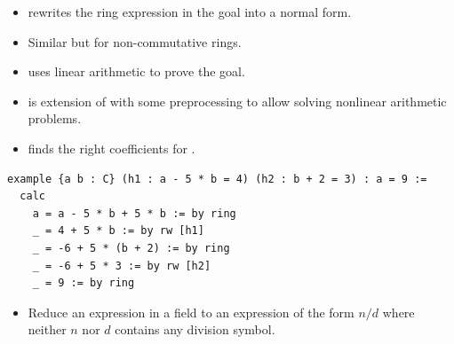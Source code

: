 \documentclass[a4paper]{article}
\begin{document}

\begin{itemize}
    \item \ringnf rewrites the ring expression in the goal into a normal form.
\end{itemize}


\begin{itemize}
    \item Similar but for non-commutative rings.
\end{itemize}


\begin{itemize}
    \item \linarith uses linear arithmetic to prove the goal.
\end{itemize}


\begin{itemize}
    \item \nlinarith is extension of \linarith with some preprocessing to allow solving nonlinear arithmetic problems.
\end{itemize}



\begin{itemize}
    \item \polyrith finds the right coefficients for \linearcombination.
\end{itemize}


\begin{verbatim}
example {a b : C} (h1 : a - 5 * b = 4) (h2 : b + 2 = 3) : a = 9 :=
  calc
    a = a - 5 * b + 5 * b := by ring
    _ = 4 + 5 * b := by rw [h1]
    _ = -6 + 5 * (b + 2) := by ring
    _ = -6 + 5 * 3 := by rw [h2]
    _ = 9 := by ring
\end{verbatim}


\begin{itemize}
    \item Reduce an expression in a field to an expression of the form $n / d$ where neither $n$ nor $d$ contains any division symbol.
\end{itemize}
\end{document}
